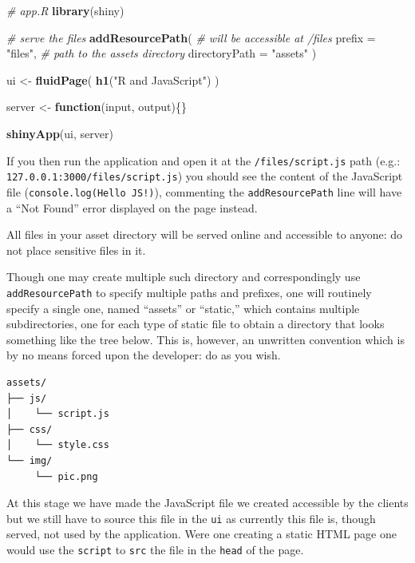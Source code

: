 \documentclass[
]{krantz}
\makeatletter
\newenvironment{Shaded}{\begin{snugshade}}{\end{snugshade}}
\newcommand{\CommentTok}[1]{\textcolor[rgb]{0.37,0.37,0.37}{\textit{#1}}}
\newcommand{\ControlFlowTok}[1]{\textcolor[rgb]{0.27,0.27,0.27}{\textbf{#1}}}
\newcommand{\DataTypeTok}[1]{\textcolor[rgb]{0.27,0.27,0.27}{#1}}
\newcommand{\KeywordTok}[1]{\textcolor[rgb]{0.27,0.27,0.27}{\textbf{#1}}}
\newcommand{\NormalTok}[1]{#1}
\newcommand{\StringTok}[1]{\textcolor[rgb]{0.5,0.5,0.5}{#1}}
\newenvironment{kframe}{%
\medskip{}
\setlength{\fboxsep}{.8em}
 \def\at@end@of@kframe{}%
 \ifinner\ifhmode%
  \def\at@end@of@kframe{\end{minipage}}%
  \begin{minipage}{\columnwidth}%
 \fi\fi%
 \def\FrameCommand##1{\hskip\@totalleftmargin \hskip-\fboxsep
 \colorbox{shadecolor}{##1}\hskip-\fboxsep
     \hskip-\linewidth \hskip-\@totalleftmargin \hskip\columnwidth}%
 \MakeFramed {\advance\hsize-\width
   \@totalleftmargin\z@ \linewidth\hsize
   \@setminipage}}%
 {\par\unskip\endMakeFramed%
 \at@end@of@kframe}
\renewenvironment{Shaded}{\begin{kframe}}{\end{kframe}}
\newenvironment{rmdblock}[1]
  {
  \begin{itemize}
  \renewcommand{\labelitemi}{
    \raisebox{-.7\height}[0pt][0pt]{
      {\setkeys{Gin}{width=3em,keepaspectratio}\texttt{[image: images/\#1]}}
    }
  }
  \setlength{\fboxsep}{1em}
  \begin{kframe}
  \item
  }
  {
  \end{kframe}
  \end{itemize}
  }
\newenvironment{rmdnote}
  {\begin{rmdblock}{note}}
  {\end{rmdblock}}
\makeatother
\begin{document}
\begin{Shaded}
\begin{Highlighting}[]
\CommentTok{\# app.R}
\KeywordTok{library}\NormalTok{(shiny)}

\CommentTok{\# serve the files}
\KeywordTok{addResourcePath}\NormalTok{(}
  \CommentTok{\# will be accessible at /files}
  \DataTypeTok{prefix =} \StringTok{"files"}\NormalTok{, }
  \CommentTok{\# path to the assets directory}
  \DataTypeTok{directoryPath =} \StringTok{"assets"}
\NormalTok{)}

\NormalTok{ui <{-}}\StringTok{ }\KeywordTok{fluidPage}\NormalTok{(}
  \KeywordTok{h1}\NormalTok{(}\StringTok{"R and JavaScript"}\NormalTok{)}
\NormalTok{)}

\NormalTok{server <{-}}\StringTok{ }\ControlFlowTok{function}\NormalTok{(input, output)\{\}}

\KeywordTok{shinyApp}\NormalTok{(ui, server)}
\end{Highlighting}
\end{Shaded}

If you then run the application and open it at the \texttt{/files/script.js} path (e.g.: \texttt{127.0.0.1:3000/files/script.js}) you should see the content of the JavaScript file (\texttt{console.log(\textquotesingle{}Hello\ JS!\textquotesingle{})}), commenting the \texttt{addResourcePath} line will have a ``Not Found'' error displayed on the page instead.

\begin{rmdnote}
All files in your asset directory will be served online and accessible
to anyone: do not place sensitive files in it.
\end{rmdnote}

Though one may create multiple such directory and correspondingly use \texttt{addResourcePath} to specify multiple paths and prefixes, one will routinely specify a single one, named ``assets'' or ``static,'' which contains multiple subdirectories, one for each type of static file to obtain a directory that looks something like the tree below. This is, however, an unwritten convention which is by no means forced upon the developer: do as you wish.

\begin{verbatim}
assets/
├── js/
│    └── script.js
├── css/
│    └── style.css
└── img/
     └── pic.png
\end{verbatim}

At this stage we have made the JavaScript file we created accessible by the clients but we still have to source this file in the \texttt{ui} as currently this file is, though served, not used by the application. Were one creating a static HTML page one would use the \texttt{script} to \texttt{src} the file in the \texttt{head} of the page.
\end{document}
